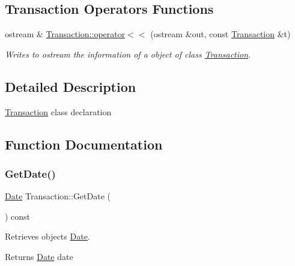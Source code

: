 \subsection*{Transaction Operators Functions}
\begin{DoxyCompactItemize}
\item 
ostream \& \hyperlink{group___transaction_ga75af23fbc3b593013d411cf50c5a3a7a}{Transaction\+::operator$<$$<$} (ostream \&out, const \hyperlink{class_transaction}{Transaction} \&t)
\begin{DoxyCompactList}\small\item\em Writes to ostream the information of a object of class \hyperlink{class_transaction}{Transaction}. \end{DoxyCompactList}\end{DoxyCompactItemize}


\subsection{Detailed Description}
\hyperlink{class_transaction}{Transaction} class declaration 

\subsection{Function Documentation}
\mbox{\label{group___transaction_ga05b17fe71d38937648b77f964df4de5d}} 
\subsubsection{\texorpdfstring{Get\+Date()}{GetDate()}}
{\footnotesize\ttfamily \hyperlink{class_date}{Date} Transaction\+::\+Get\+Date (\begin{DoxyParamCaption}{ }\end{DoxyParamCaption}) const}



Retrieves object\textquotesingle{}s \hyperlink{class_date}{Date}. 

\begin{DoxyReturn}{Returns}
\hyperlink{class_date}{Date} date 
\end{DoxyReturn}
\mbox{\label{group___transaction_ga73ff525f9baae732b1256533736e5052}} 
